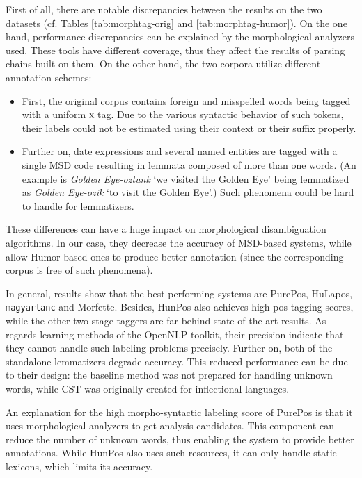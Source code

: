 First of all, there are notable discrepancies between the results on the two datasets (cf. Tables \ref{tab:morphtag-orig} and \ref{tab:morphtag-humor}). 
On the one hand, performance discrepancies can be explained by the morphological analyzers used.
These tools have different coverage, thus they affect the results of parsing chains built on them.
On the other hand, the two corpora utilize different annotation schemes:
\begin{itemize}
  \item First, the original corpus contains foreign and misspelled words being tagged with a uniform \textsc{x} tag. 
  Due to the various syntactic behavior of such tokens, their labels could not be estimated using their context or their suffix properly.
  \item Further on, date expressions and several named entities are tagged with a single MSD code resulting in lemmata composed of more than one words. (An example is \emph{Golden Eye-oztunk} `we visited the Golden Eye’ being lemmatized as \emph{Golden Eye-ozik} `to visit the Golden Eye’.) 
  Such phenomena could be hard to handle for lemmatizers.
\end{itemize}
These differences can have a huge impact on morphological disambiguation algorithms.
In our case, they decrease the accuracy of MSD-based systems, while allow Humor-based ones to produce better annotation  (since the corresponding corpus is free of such phenomena).

In general, results show that the best-performing systems are PurePos, HuLapos, \texttt{magyarlanc} and Morfette.
Besides, HunPos also achieves high \acrshort{pos} tagging scores, while the other two-stage taggers are far behind state-of-the-art results. 
As regards learning methods of the OpenNLP toolkit, their precision indicate that they cannot handle such labeling problems precisely.
Further on, both of the standalone lemmatizers degrade accuracy. 
This reduced performance can be due to their design: the baseline method was not prepared for handling unknown words, while CST was originally created for inflectional languages. 

An explanation for the high morpho-syntactic labeling score of PurePos is that it uses morphological analyzers to get analysis candidates. 
This component can reduce the number of unknown words, thus enabling the system to provide better annotations.
While HunPos also uses such resources, it can only handle static lexicons, which limits its accuracy.

